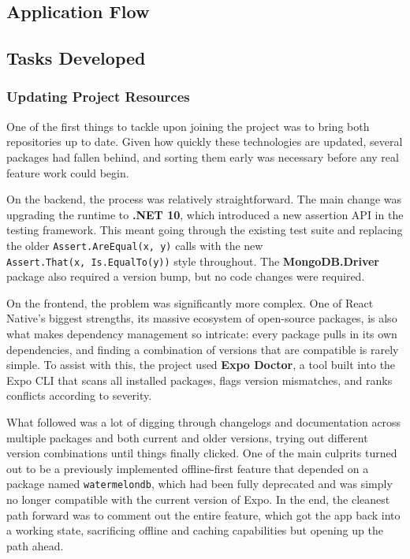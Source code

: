 \documentclass[11pt,a4paper]{article}
\begin{document}
\subsection{Application Flow}
\label{sub:appflow}



\newpage
\subsection{Tasks Developed}
\label{sub:features}


\subsubsection{Updating Project Resources}
\label{subsub:updates}

One of the first things to tackle upon joining the project was to bring both repositories up to date.
Given how quickly these technologies are updated, several packages had fallen behind, and sorting them early was necessary before any real feature work could begin.
 
On the backend, the process was relatively straightforward.
The main change was upgrading the runtime to \textbf{.NET 10}, which introduced a new assertion API in the testing framework.
This meant going through the existing test suite and replacing the older \texttt{Assert.AreEqual(x,~y)} calls with the new \texttt{Assert.That(x,~Is.EqualTo(y))} style throughout.
The \textbf{MongoDB.Driver} package also required a version bump, but no code changes were required.
 
On the frontend, the problem was significantly more complex.
One of React Native's biggest strengths, its massive ecosystem of open-source packages, is also what makes dependency management so intricate: every package pulls in its own dependencies, and finding a combination of versions that are compatible is rarely simple.
To assist with this, the project used \textbf{Expo Doctor}, a tool built into the Expo CLI that scans all installed packages, flags version mismatches, and ranks conflicts according to severity.
 
What followed was a lot of digging through changelogs and documentation across multiple packages and both current and older versions, trying out different version combinations until things finally clicked.
One of the main culprits turned out to be a previously implemented offline-first feature that depended on a package named \texttt{watermelondb}, which had been fully deprecated and was simply no longer compatible with the current version of Expo.
In the end, the cleanest path forward was to comment out the entire feature, which got the app back into a working state, sacrificing offline and caching capabilities but opening up the path ahead.
 
\end{document}
